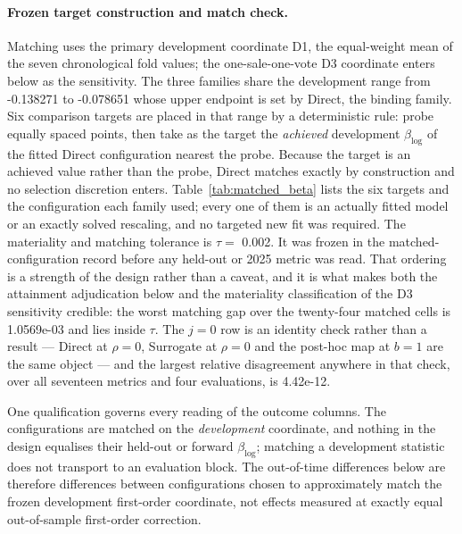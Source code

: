 \documentclass[10pt]{article}
\theoremstyle{definition}
\newcommand{\1}{\mathbf{1}}
\begin{document}
\paragraph{Frozen target construction and match check.}
Matching uses the primary development coordinate D1, the equal-weight mean of the seven
chronological fold values; the one-sale-one-vote D3 coordinate enters below as the sensitivity. The
three families share the development range from -0.138271 to -0.078651 whose upper endpoint is
set by Direct, the binding family. Six comparison targets are placed in that range by a
deterministic rule: probe equally spaced points, then take as the target the \emph{achieved}
development $\beta_{\log}$ of the fitted Direct configuration nearest the probe. Because the target
is an achieved value rather than the probe, Direct matches exactly by construction and no selection
discretion enters. Table~\ref{tab:matched_beta} lists the six targets and the configuration each
family used; every one of them is an actually fitted model or an exactly solved rescaling, and no
targeted new fit was required. The materiality and matching tolerance is
$\tau=$ 0.002. It was frozen in the matched-configuration record before any held-out or 2025
metric was read. That ordering is a strength of the design rather than a caveat, and it is what makes both the
attainment adjudication below and the materiality classification of the D3 sensitivity credible: the
worst matching gap over the twenty-four matched cells is 1.0569e-03 and lies inside $\tau$. The
$j=0$ row is an identity check rather than a result --- Direct at $\rho=0$, Surrogate at $\rho=0$
and the post-hoc map at $b=1$ are the same object --- and the largest relative disagreement anywhere
in that check, over all seventeen metrics and four evaluations, is 4.42e-12.

One qualification governs every reading of the outcome columns. The configurations are
matched on the \emph{development} coordinate, and nothing in the design equalises their held-out or
forward $\beta_{\log}$; matching a development statistic does not transport to an evaluation block.
The out-of-time differences below are therefore differences between configurations chosen to
approximately match the frozen development first-order coordinate, not effects measured at exactly
equal out-of-sample first-order correction.
\end{document}
